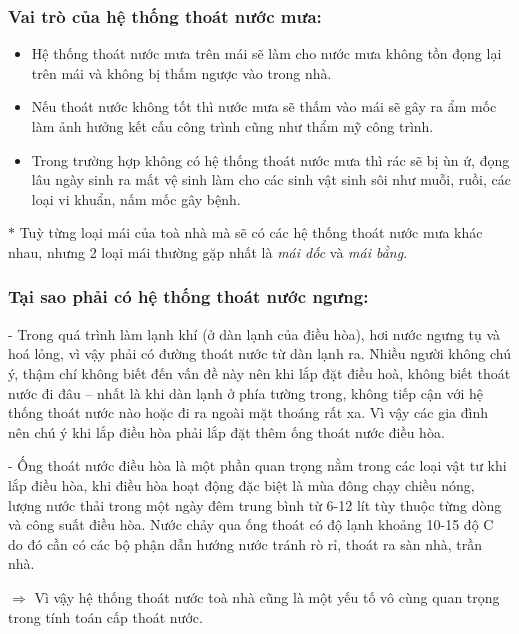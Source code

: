	\subsubsection{Vai trò của hệ thống thoát nước mưa:}
	\begin{itemize}
		\vspace{-2mm}
		\setlength\itemsep{1mm}
		\item Hệ thống thoát nước mưa trên mái sẽ làm cho nước mưa không tồn đọng lại trên mái và không bị thấm ngược vào trong nhà.
		\item Nếu thoát nước không tốt thì nước mưa sẽ thấm vào mái sẽ gây ra ẩm mốc làm ảnh hưởng kết cấu công trình cũng như thẩm mỹ công trình.
		\item Trong trường hợp không có hệ thống thoát nước mưa thì rác sẽ bị ùn ứ, đọng lâu ngày sinh ra mất vệ sinh làm cho các sinh vật sinh sôi như muỗi, ruồi, các loại vi khuẩn, nấm mốc gây bệnh.
	\end{itemize}
	
	$\ast$ Tuỳ từng loại mái của toà nhà mà sẽ có các hệ thống thoát nước mưa khác nhau, nhưng 2 loại mái thường gặp nhất là \emph{mái dốc} và \emph{mái bằng}.
	
	\subsubsection{Tại sao phải có hệ thống thoát nước ngưng:}
	- Trong quá trình làm lạnh khí (ở dàn lạnh của điều hòa), hơi nước ngưng tụ và hoá lỏng, vì vậy phải có đường thoát nước từ dàn lạnh ra. Nhiều người không chú ý, thậm chí không biết đến vấn đề này nên khi lắp đặt điều hoà, không biết thoát nước đi đâu – nhất là khi dàn lạnh ở phía tường trong, không tiếp cận với hệ thống thoát nước nào hoặc đi ra ngoài mặt thoáng rất xa. Vì vậy các gia đình nên chú ý khi lắp điều hòa phải lắp đặt thêm ống thoát nước điều hòa.

- Ống thoát nước điều hòa là một phần quan trọng nằm trong các loại vật tư khi lắp điều hòa, khi điều hòa hoạt động đặc biệt là mùa đông chạy chiều nóng, lượng nước thải trong một ngày đêm trung bình từ 6-12 lít tùy thuộc từng dòng và công suất điều hòa. Nước chảy qua ống thoát có độ lạnh khoảng 10-15 độ C do đó cần có các bộ phận dẫn hướng nước tránh rò rỉ, thoát ra sàn nhà, trần nhà.
	
	\vspace{0.5cm}$\pmb{\Rightarrow}$ Vì vậy hệ thống thoát nước toà nhà cũng là một yếu tố vô cùng quan trọng trong tính toán cấp thoát nước.
	
